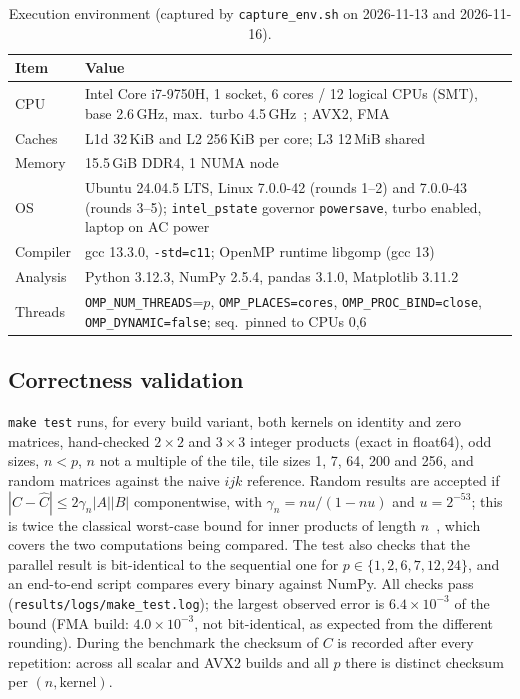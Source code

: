 \documentclass[conference,a4paper]{IEEEtran}
\begin{document}
\begin{table}[t]
\centering
\caption{Execution environment (captured by \texttt{capture\_env.sh} on 2026-11-13 and 2026-11-16).}
\label{tab:env}
\footnotesize
\setlength{\tabcolsep}{3pt}
\begin{tabular}{@{}lp{}@{}}
\toprule
Item & Value \\
\midrule
CPU & Intel Core i7-9750H, 1 socket, 6 cores / 12 logical CPUs (SMT), base 2.6\,GHz, max.\ turbo
      4.5\,GHz~\cite{intel9750h}; AVX2, FMA \\
Caches & L1d 32\,KiB and L2 256\,KiB per core; L3 12\,MiB shared \\
Memory & 15.5\,GiB DDR4, 1 NUMA node \\
OS & Ubuntu 24.04.5 LTS, Linux 7.0.0-42 (rounds 1--2) and 7.0.0-43 (rounds 3--5); \texttt{intel\_pstate} governor \texttt{powersave},
     turbo enabled, laptop on AC power \\
Compiler & gcc 13.3.0, \texttt{-std=c11}; OpenMP runtime libgomp (gcc 13) \\
Analysis & Python 3.12.3, NumPy 2.5.4, pandas 3.1.0, Matplotlib 3.11.2 \\
Threads & \texttt{OMP\_NUM\_THREADS}=$p$, \texttt{OMP\_PLACES=cores}, \texttt{OMP\_PROC\_BIND=close},
          \texttt{OMP\_DYNAMIC=false}; seq.\ pinned to CPUs 0,6 \\
\bottomrule
\end{tabular}
\end{table}

\subsection{Correctness validation}
\texttt{make test} runs, for every build variant, both kernels on identity and zero matrices,
hand-checked $2\times2$ and $3\times3$ integer products (exact in float64), odd sizes, $n<p$,
$n$ not a multiple of the tile, tile sizes 1, 7, 64, 200 and 256, and random matrices against the naive
$ijk$ reference. Random results are accepted if $|C-\hat C|\le 2\gamma_n|A||B|$ componentwise, with
$\gamma_n=nu/(1-nu)$ and $u=2^{-53}$; this is twice the classical worst-case bound for inner products of
length $n$~\cite{higham2002}, which covers the two computations being compared. The test also checks that
the parallel result is bit-identical to the sequential one for $p\in\{1,2,6,7,12,24\}$, and an
end-to-end script compares every binary against NumPy. All checks pass
(\texttt{results/logs/make\_test.log}); the largest observed error is $6.4\times10^{-3}$ of the bound
(FMA build: $4.0\times10^{-3}$, not bit-identical, as expected from the different rounding). During the
benchmark the checksum of $C$ is recorded after every repetition: across all scalar and AVX2 builds and
all $p$ there is \ChecksumDistinctMax{} distinct checksum per $(n,\text{kernel})$.
\end{document}
